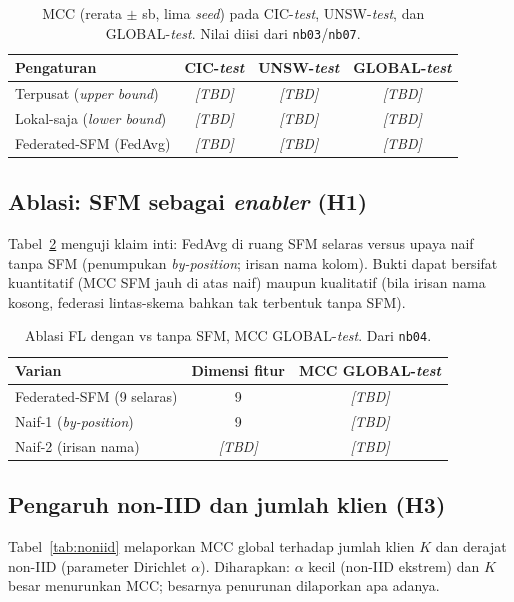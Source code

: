 \documentclass[11pt,a4paper]{article}
\newcommand{\TBD}{\textit{[TBD]}}
\begin{document}
\begin{table}[t]
\centering
\caption{MCC (rerata $\pm$ sb, lima \emph{seed}) pada CIC-\emph{test},
UNSW-\emph{test}, dan GLOBAL-\emph{test}. Nilai diisi dari \texttt{nb03}/\texttt{nb07}.}
\label{tab:main}
\begin{tabular}{lccc}
\toprule
Pengaturan & CIC-\emph{test} & UNSW-\emph{test} & GLOBAL-\emph{test} \\
\midrule
Terpusat (\emph{upper bound}) & \TBD & \TBD & \TBD \\
Lokal-saja (\emph{lower bound}) & \TBD & \TBD & \TBD \\
Federated-SFM (FedAvg) & \TBD & \TBD & \TBD \\
\bottomrule
\end{tabular}
\end{table}

\subsection{Ablasi: SFM sebagai \emph{enabler} (H1)}
Tabel~\ref{tab:ablation} menguji klaim inti: FedAvg di ruang SFM selaras versus
upaya naif tanpa SFM (penumpukan \emph{by-position}; irisan nama kolom). Bukti
dapat bersifat kuantitatif (MCC SFM jauh di atas naif) maupun kualitatif (bila
irisan nama kosong, federasi lintas-skema bahkan tak terbentuk tanpa SFM).

\begin{table}[t]
\centering
\caption{Ablasi FL dengan vs tanpa SFM, MCC GLOBAL-\emph{test}. Dari \texttt{nb04}.}
\label{tab:ablation}
\begin{tabular}{lcc}
\toprule
Varian & Dimensi fitur & MCC GLOBAL-\emph{test} \\
\midrule
Federated-SFM (9 selaras) & 9 & \TBD \\
Naif-1 (\emph{by-position}) & 9 & \TBD \\
Naif-2 (irisan nama) & \TBD & \TBD \\
\bottomrule
\end{tabular}
\end{table}

\subsection{Pengaruh non-IID dan jumlah klien (H3)}
Tabel~\ref{tab:noniid} melaporkan MCC global terhadap jumlah klien $K$ dan derajat
non-IID (parameter Dirichlet $\alpha$). Diharapkan: $\alpha$ kecil (non-IID
ekstrem) dan $K$ besar menurunkan MCC; besarnya penurunan dilaporkan apa adanya.
\end{document}
